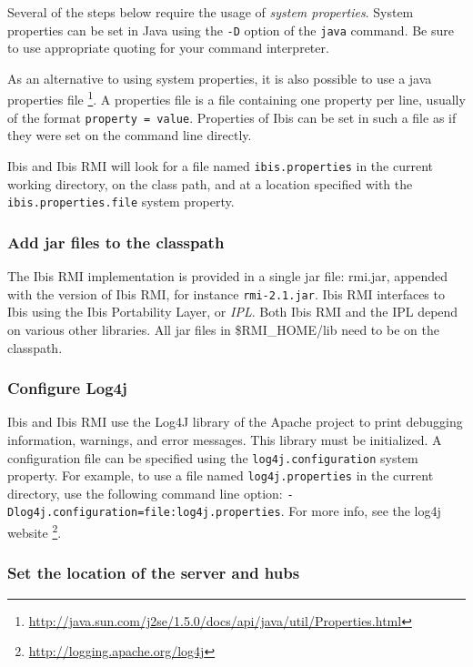 \documentclass[a4paper,10pt]{article}
\begin{document}
Several of the steps below require the usage of \emph{system properties}.
System properties can be set in Java using the \texttt{-D} option of the
\texttt{java} command. Be sure to use appropriate quoting for your
command interpreter.

As an alternative to using system properties, it is also possible to use
a java properties file
\footnote{\url{http://java.sun.com/j2se/1.5.0/docs/api/java/util/Properties.html}}.
A properties file is a file containing one property per line, usually of
the format \texttt{property = value}. Properties of Ibis can be set in
such a file as if they were set on the command line directly.

Ibis and Ibis RMI will look for a file named \texttt{ibis.properties} in the
current working directory, on the class path, and at a location specified
with the \texttt{ibis.properties.file} system property.

\subsubsection{Add jar files to the classpath}

The Ibis RMI implementation is provided in a single jar file: rmi.jar,
appended with the version of Ibis RMI, for instance \texttt{rmi-2.1.jar}.
Ibis RMI interfaces to Ibis using the Ibis Portability Layer, or
\emph{IPL}. Both Ibis RMI and the IPL depend on various other libraries.
All jar files in \$RMI\_HOME/lib need to be on the classpath.

\subsubsection{Configure Log4j}

Ibis and Ibis RMI use the Log4J library of the Apache project to print debugging
information, warnings, and error messages. This library must be
initialized. A configuration file can be specified using the
\texttt{log4j.configuration} system property. For example, to use a file
named \texttt{log4j.properties} in the current directory, use the
following command line option:
\texttt{-Dlog4j.configuration=file:log4j.properties}. For more info,
see the log4j website \footnote{\url{http://logging.apache.org/log4j}}.

\subsubsection{Set the location of the server and hubs}
\end{document}
